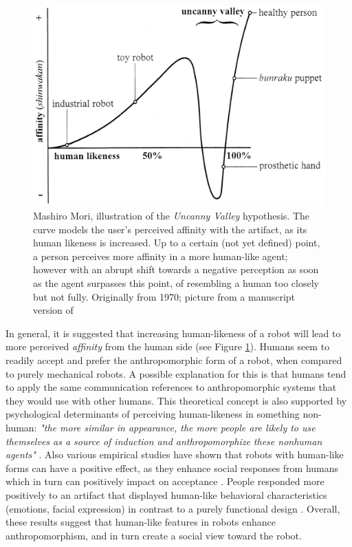 \documentclass{frontiersSCNS} %
\begin{document}
\begin{figure}\centering
  \includegraphics[scale=0.75]{uncanny-valley.jpg}
 \caption{Mashiro Mori, illustration of the \textit{Uncanny Valley} hypothesis. The curve models the user's perceived affinity with the artifact, as its human likeness is increased. Up to a certain (not yet defined) point, a person perceives more affinity in a more human-like agent; however with an abrupt shift towards a negative perception as soon as the agent surpasses this point, of resembling a human too closely but not fully. Originally from 1970; picture from a manuscript version of \cite{mori_uncanny_2012}}
 \label{fig:uncanny_valley}       %
 \end{figure}

 
In general, it is suggested that increasing human-likeness of a robot will lead to 
more perceived \textit{affinity} from the human side \citep{mori_uncanny_1970} (see 
Figure \ref{fig:uncanny_valley}). Humans seem to readily accept and prefer the 
anthropomorphic form of a robot, when compared to purely mechanical robots. A 
possible explanation for this is that 
humans tend to apply the same communication references to anthropomorphic systems 
that they would use with other humans. This theoretical concept is also supported 
by psychological determinants of 
perceiving human-likeness in something non-human: \textit{"the more similar in 
appearance, the more people are likely to use themselves as a source of induction 
and anthropomorphize these nonhuman agents"} \citep{epley_seeing_2007}. 
Also various 
empirical studies have shown that robots with human-like forms can have a positive 
effect, as they enhance social 
responses from humans which in turn can positively impact on acceptance 
\citep{duffy_anthropomorphism_2003,goetz_cooperation_2002,venkatesh_theoretical_2000}. 
People responded more positively to an artifact that displayed human-like 
behavioral characteristics (emotions, facial expression) in contrast to a purely 
functional design 
\citep{eyssel_anthropomorphic_2010,krach_can_2008,reeves_media_1996,riek_how_2009}. 
Overall, these results suggest that human-like features in robots enhance 
anthropomorphism, and in turn create a social view toward the robot.
\end{document}
